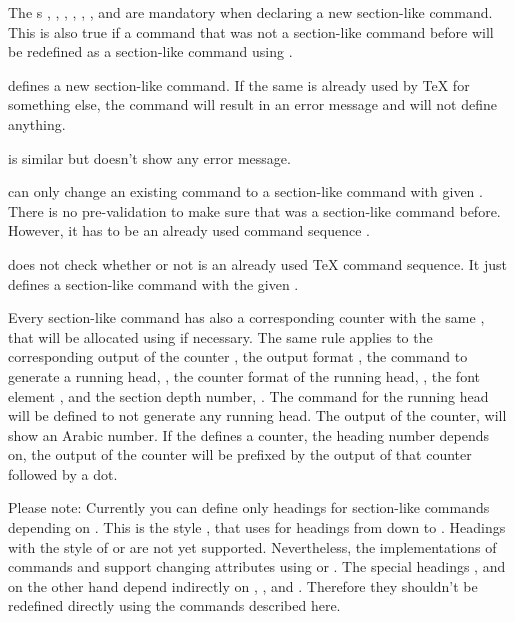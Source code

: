 The s , , ,
, , , and 
are mandatory when declaring a new section-like command. This is also true if
a command that was not a section-like command before will be redefined as a
section-like command using .

 defines a new section-like command. If the
same  is already used by \TeX{} for something else, the command
will result in an error message and will not define anything.

 is similar but doesn't show any error message.

 can only change an existing command to a
section-like command with given . There is no pre-validation
to make sure that  was a section-like command
before. However, it has to be an already used command sequence .

 does not check whether or not  is
an already used \TeX{} command sequence. It just defines a section-like
command  with the given .

Every section-like command has also a corresponding counter with the same
, that will be allocated using  if
necessary. The same rule applies to the corresponding output of the counter
, the output format , the
command to generate a running head, , the counter
format of the running head, , the font element
, and the section depth number,
. The command for the running head
 will be defined to not generate any running head. The
output of the counter,  will show an Arabic number. If
the   defines a counter, the heading number
depends on, the output of the counter will be prefixed by the output of that
counter followed by a dot.

Please note: Currently you can define only headings for
section-like commands depending on . This is the style
, that \KOMAScript{} uses for headings from 
down to . Headings with the style of  or
 are not yet supported. Nevertheless, the implementations of
commands  and  support changing attributes using
 or . The
special headings ,  and  on the
other hand depend indirectly on , , and
. Therefore they shouldn't be redefined directly using the
commands described here.

